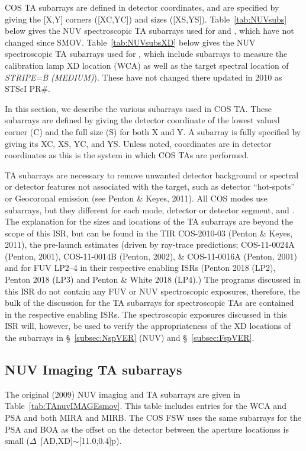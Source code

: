 COS TA subarrays are defined in detector coordinates, and are specified by giving the [X,Y] corners ([XC,YC]) and sizes ([XS,YS]).
Table~\ref{tab:NUVsubs} below gives the NUV spectroscopic TA subarrays used for  and , which have not changed since SMOV.
Table~\ref{tab:NUVsubsXD} below gives the NUV spectroscopic TA subarrays used for , which include subarrays to measure the
calibration lamp XD location (WCA) as well as the target spectral location of \textit{STRIPE=B (MEDIUM)}).
These have not changed there updated in 2010 as STScI PR\#{}.

In this section, we describe the various subarrays used in COS TA.
These subarrays are defined by giving the detector coordinate of the lowest valued corner (C) and the full size (S) for both X and Y.
A subarray is fully specified by giving its XC, XS, YC, and YS. Unless noted, coordinates are in detector coordinates as this is the system in which COS TAs are performed.

TA subarrays are necessary to remove unwanted detector background or spectral or detector features not associated with the target, such as detector
``hot-spots'' or Geocoronal emission (see Penton \& Keyes, 2011). All COS \tacq{} modes use subarrays, but they different for each mode, detector or detector segment,
and \cenwave.  The explanation for the sizes and locations of the TA subarrays are beyond the scope of this ISR, but can be found in the TIR COS-2010-03 (Penton \& Keyes, 2011),
the pre-launch estimates (driven by ray-trace predictions; COS-11-0024A (Penton, 2001), COS-11-0014B (Penton, 2002), \& COS-11-0016A (Penton, 2001) and for
FUV LP2--4 in their respective enabling ISRs (Penton 2018 (LP2), Penton 2018 (LP3) and Penton \& White 2018 (LP4).)
The programs discussed in this ISR do not contain any FUV or NUV spectroscopic \tacq{} exposures, therefore, the bulk of the discussion for the TA subarrays for
spectroscopic TAs are contained in the respective enabling ISRs. The spectroscopic exposures discussed in this ISR will, however, be used to verify
the appropriateness of the XD locations of the subarrays in \S~\ref{subsec:NspVER} (NUV) and \S~\ref{subsec:FspVER}.

\subsection{NUV Imaging TA subarrays}\label{subsec:NUVimSUBS}
The original (2009) NUV imaging  and  TA subarrays are given in Table~\ref{tab:TAnuvIMAGEsmov}.
This table includes entries for the WCA and PSA and both MIRA and MIRB.
The COS FSW uses the same subarrays for the PSA and BOA as the offset on the detector between the aperture locationss is small ($\Delta$~[AD,XD]$\sim$[11.0,0.4]p).

